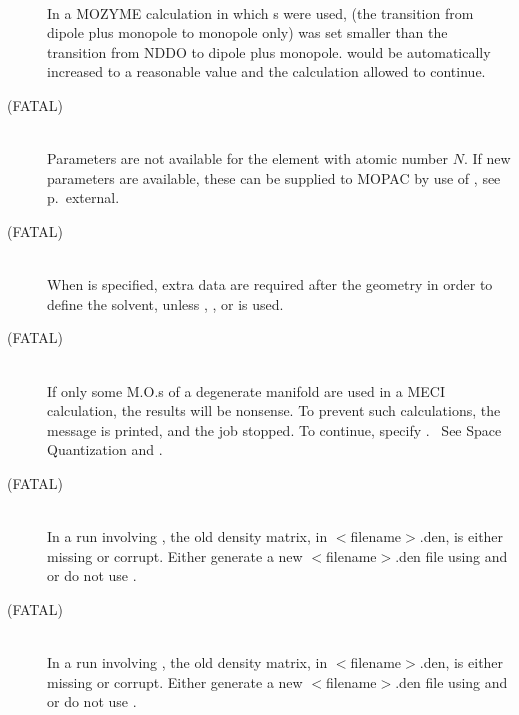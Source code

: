 \begin{description}
\item[]~\\
In a MOZYME calculation in which s were used,  (the 
transition from dipole plus monopole to monopole only) was set smaller than
the transition from NDDO to dipole plus monopole.   would be
automatically increased to a reasonable value and the calculation allowed to
continue.

\item[ (FATAL)]~\\

Parameters are not available for the element with atomic number $N$. If
new parameters are available, these can be supplied to MOPAC by use of
\hyperref[pageref]{}{, see p.~}{}{external}.

\item[ (FATAL)]~\\
When  is specified, extra data are required after the geometry
in order to define the solvent, unless , , or 
 is used.

\item[ (FATAL)]~\\
If only some M.O.s of a degenerate manifold are used in a MECI calculation,
the results will be nonsense.  To prevent such calculations, the message
 is printed, and the job stopped.  To continue,
specify . \ See Space Quantization and .

\item[ (FATAL)]~\\
In a run involving  , the old density matrix,
in $<\!$filename$\!>$.den, is either missing or corrupt.  Either generate
a new $<\!$filename$\!>$.den file using  and  or
do not use .

\item[ (FATAL)]~\\
In a run involving , the old density matrix,
in $<\!$filename$\!>$.den, is either missing or corrupt.  Either generate
a new $<\!$filename$\!>$.den file using  and  or
do not use .


\end{description}
